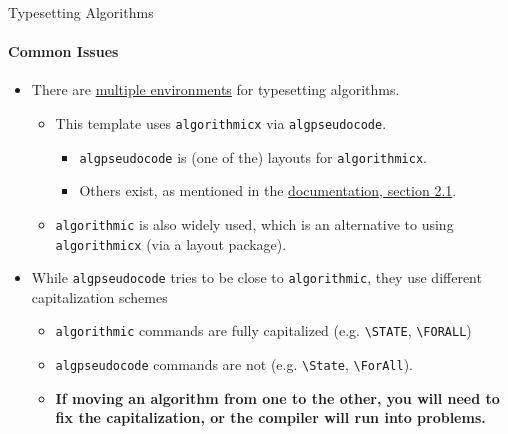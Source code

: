 \documentclass{beamer}
\newcommand{\hrefcol}[2]{\textcolor{uihteal}{\href{#1}{#2}}}
\begin{document}
\begin{frame}[fragile]{Typesetting Algorithms}
\framesubtitle{Common Issues}
\begin{itemize}
    \item There are \hrefcol{https://tex.stackexchange.com/questions/229355}{multiple environments} for typesetting algorithms.
    \begin{itemize}
        \item This template uses \texttt{algorithmicx} via \texttt{algpseudocode}.
        \begin{itemize}
            \item \texttt{algpseudocode} is (one of the) layouts for \texttt{algorithmicx}.
            \item Others exist, as mentioned in the \hrefcol{https://www.ctan.org/tex-archive/macros/latex/contrib/algorithmicx/algorithmicx.pdf}{documentation, section 2.1}.
        \end{itemize}
        \item \texttt{algorithmic} is also widely used, which is an alternative to using \texttt{algorithmicx} (via a layout package).
    \end{itemize}
    \item While \texttt{algpseudocode} tries to be close to \texttt{algorithmic}, they use different capitalization schemes
    \begin{itemize}
        \item \texttt{algorithmic} commands are fully capitalized (e.g. \verb|\STATE|, \verb|\FORALL|)
        \item \texttt{algpseudocode} commands are not (e.g. \verb|\State|, \verb|\ForAll|).
        \item \textbf{If moving an algorithm from one to the other, you will need to fix the capitalization, or the compiler will run into problems.}
    \end{itemize}
\end{itemize}
\end{frame}
\end{document}
